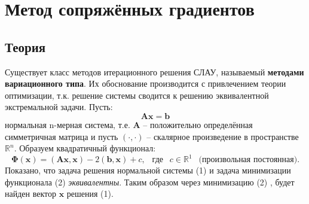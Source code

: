\section{Метод сопряжённых градиентов}

\subsection{Теория}

Существует класс методов итерационного решения СЛАУ, называемый {\bf методами вариационного типа}. Их обоснование производится с привлечением теории оптимизации, т.к. решение системы сводится к решению эквивалентной экстремальной задачи. Пусть:
\begin{equation}
    \mathbf{Ax=b}
\end{equation}
нормальная n-мерная система, т.е. $\mathbf{A}$ -- положительно определённая симметричная матрица и пусть $(\cdot, \cdot)$ -- скалярное произведение в пространстве $\mathbb{R}^n$. Образуем квадратичный функционал:
\begin{equation}
    \mathbf{\Phi}(\mathbf{x})=(\mathbf{Ax}, \mathbf{x}) - 2(\mathbf{b}, \mathbf{x}) + c,
    ~~\text{ где }~~ c \in \mathbb{R}^1 ~~\text{ (произвольная постоянная)}.
\end{equation}
Показано, что задача решения нормальной системы (1) и задача минимизации функционала (2) {\it эквивалентны}. Таким образом через минимизацию (2) , будет найден вектор $\mathbf{x}$ решения (1).

